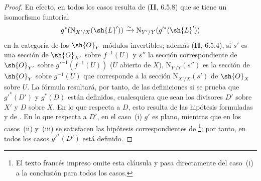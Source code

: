 \begin{proof}
En efecto, en todos los casos resulta de (\textbf{II}, 6.5.8) que se tiene un isomorfismo funtorial
\[
  g^*(\mathrm{N}_{X'/X}(\sh{L}'))\xrightarrow{\sim}\mathrm{N}_{Y'/Y}(g'^*(\sh{L}'))
\]
en la categoría de los $\sh{O}_Y$-módulos invertibles;
además (\textbf{II}, 6.5.4), si $s'$ es una sección de $\sh{O}_{X'}$ sobre $f^{-1}(U)$ y $s''$ la sección correspondiente de $\sh{O}_{Y'}$ sobre $g'^{-1}(f^{-1}(U))$ ($U$ abierto de $X$), $\mathrm{N}_{Y'/Y}(s'')$ es la sección de $\sh{O}_Y$ sobre $g^{-1}(U)$ que corresponde a la sección $\mathrm{N}_{X'/X}(s')$ de $\sh{O}_X$ sobre $U$.
La fórmula  resultará, por tanto, de las definiciones si se prueba que $g'^*(D')$ y $g^*(D)$ están definidos, cualesquiera que sean los divisores $D'$ sobre $X'$ y $D$ sobre $X$.
En lo que respecta a $D$, esto resulta de las hipótesis formuladas y de .
En lo que respecta a $D'$, en el caso~(i) $g'$ es plano, mientras que en los casos~(ii) y~(iii) se satisfacen las hipótesis correspondientes de \footnote{El texto francés impreso omite esta cláusula y pasa directamente del caso~(i) a la conclusión para todos los casos.}; por tanto, en todos los casos $g'^*(D')$ está definido.
\end{proof}
